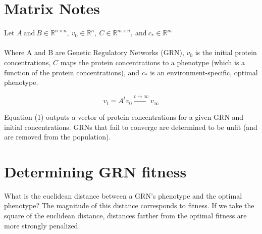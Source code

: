 \documentclass[a4paper,12pt]{article}
\begin{document}
\section{Matrix Notes}

Let $ A\ \mbox{and} \ B \in \mathbb{R}^{n \times n}, \ v_{0} \in \mathbb{R}^{n}, \ C \in \mathbb{R}^{m \times n},\ \mbox{and}  \ c_{*} \in \mathbb{R}^{m}$ \\ \\
Where A and B are Genetic Regulatory Networks (GRN), $v_{0}$ is the initial protein concentrations,     $C$ maps the protein concentrations to a phenotype (which is a function of the protein concentrations), and $c_{*}$ is an environment-specific, optimal phenotype.

\begin{equation}
v_{t} = A^{t}v_{0} \xrightarrow{t \rightarrow \infty} v_{\infty}
\end{equation}

Equation (1)  outputs a vector of protein concentrations for a given GRN and initial concentrations.  GRNs that fail to converge are determined to be unfit (and are removed from the population). 

\section{Determining GRN fitness}

What is the euclidean distance between a GRN's phenotype and the optimal phenotype? The magnitude of this distance corresponds to fitness. If we take the square of the euclidean distance, distances farther from the optimal fitness are more strongly penalized. 
\end{document}
